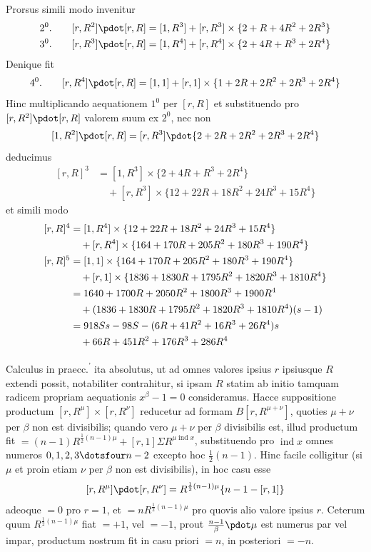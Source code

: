 Prorsus simili modo invenitur
\[
\begin{aligned}
2^0.\qquad[r,R^2]\pdot[r,R]&=[1,R^3]+[r,R^3]\times\{2+R+4R^2+2R^3\}\\
3^0.\qquad[r,R^3]\pdot[r,R]&=[1,R^4]+[r,R^4]\times\{2+4R+R^3+2R^4\}
\end{aligned}
\]
Denique fit
\[
4^0.\qquad[r,R^4]\pdot[r,R]=[1,1]+[r,1]\times\{1+2R+2R^2+2R^3+2R^4\}
\]
Hinc multiplicando aequationem $1^0$ per $[r,R]$ et substituendo pro $[r,R^2]\pdot[r,R]$ valorem suum ex $2^0$, nec non
\[
[1,R^2]\pdot[r,R]=[r,R^3]\pdot\{2+2R+2R^2+2R^3+2R^4\}
\]
deducimus
\[
\begin{aligned}
[r,R]^3&=[1,R^3]\times\{2+4R+R^3+2R^4\}\\
&\quad+[r,R^3]\times\{12+22R+18R^2+24R^3+15R^4\}
\end{aligned}
\]
et simili modo
\[
\begin{aligned}
[r,R]^4&=[1,R^4]\times\{12+22R+18R^2+24R^3+15R^4\}\\
&\quad+[r,R^4]\times\{164+170R+205R^2+180R^3+190R^4\}\\
\relax[r,R]^5&=[1,1]\times\{164+170R+205R^2+180R^3+190R^4\}\\
&\quad+[r,1]\times\{1836+1830R+1795R^2+1820R^3+1810R^4\}\\
&=1640+1700R+2050R^2+1800R^3+1900R^4\\
&\quad+(1836+1830R+1795R^2+1820R^3+1810R^4)(s-1)\\
&=918Ss-98S-(6R+41R^2+16R^3+26R^4)s\\
&\quad+66R+451R^2+176R^3+286R^4
\end{aligned}
\]

Calculus in praecc.\textsuperscript{'} ita absolutus, ut ad omnes valores ipsius $r$ ipsiusque $R$ extendi possit, notabiliter contrahitur, si ipsam $R$ statim ab initio tamquam radicem propriam aequationis $x^\beta-1=0$ consideramus. Hacce suppositione productum $[r,R^\mu]\times[r,R^\nu]$ reducetur ad formam $B[r,R^{\mu+\nu}]$, quoties $\mu+\nu$ per $\beta$ non est divisibilis; quando vero $\mu+\nu$ per $\beta$ divisibilis est, illud productum fit $=(n-1)R^{\frac12(n-1)\mu}+[r,1]\Sigma R^{\mu\operatorname{ind}x}$, substituendo pro $\operatorname{ind}x$ omnes numeros $0,1,2,3\dotsfour n-2$ excepto hoc $\frac12(n-1)$. Hinc facile colligitur (si $\mu$ et proin etiam $\nu$ per $\beta$ non est divisibilis), in hoc casu esse
\[
[r,R^\mu]\pdot[r,R^\nu]=R^{\frac12(n-1)\mu}\{n-1-[r,1]\}
\]
adeoque $=0$ pro $r=1$, et $=nR^{\frac12(n-1)\mu}$ pro quovis alio valore ipsius $r$. Ceterum quum $R^{\frac12(n-1)\mu}$ fiat $=+1$, vel $=-1$, prout $\frac{n-1}\beta\pdot\mu$ est numerus par vel impar, productum nostrum fit in casu priori $=n$, in posteriori $=-n$.

